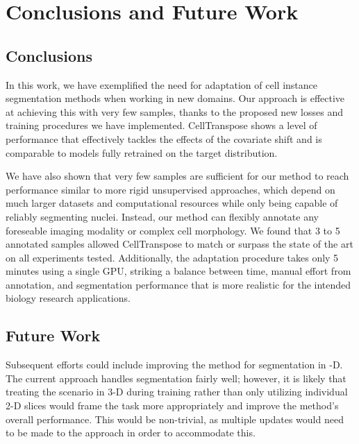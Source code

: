 
\chapter{Conclusions and Future Work} %

\label{Chapter6} %


\section{Conclusions}

In this work, we have exemplified the need for adaptation of cell instance segmentation methods when working in new domains. Our approach is effective at achieving this with very few samples, thanks to the proposed new losses and training procedures we have implemented. CellTranspose shows a level of performance that effectively tackles the effects of the covariate shift and is comparable to models fully retrained on the target distribution.

We have also shown that very few samples are sufficient for our method to reach performance similar to more rigid unsupervised approaches, which depend on much larger datasets and computational resources while only being capable of reliably segmenting nuclei. Instead, our method can flexibly annotate any foreseable imaging modality or complex cell morphology. We found that 3 to 5 annotated samples allowed CellTranspose to match or surpass the state of the art on all experiments tested. Additionally, the adaptation procedure takes only 5 minutes using a single GPU, striking a balance between time, manual effort from annotation, and segmentation performance that is more realistic for the intended biology research applications.

\section{Future Work}

Subsequent efforts could include improving the method for segmentation in -D. The current approach handles segmentation fairly well; however, it is likely that treating the scenario in 3-D during training rather than only utilizing individual 2-D slices would frame the task more appropriately and improve the method's overall performance. This would be non-trivial, as multiple updates would need to be made to the approach in order to accommodate this.

